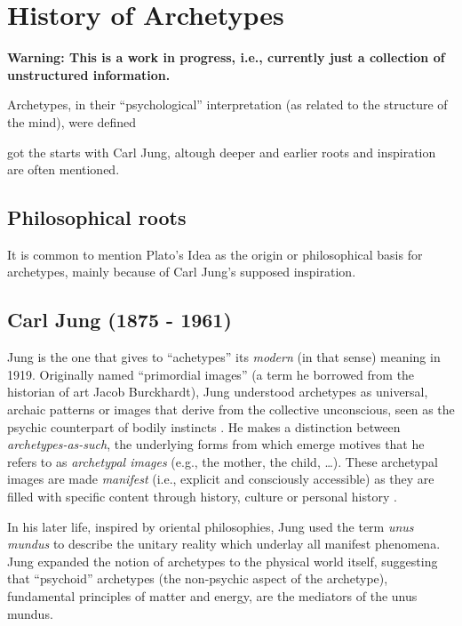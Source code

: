 \documentclass[]{book}
\begin{document}
\hypertarget{history-of-archetypes}{%
\chapter{History of Archetypes}\label{history-of-archetypes}}

\textbf{Warning: This is a work in progress, i.e., currently just a collection of unstructured information.}

Archetypes, in their ``psychological'' interpretation (as related to the structure of the mind), were defined

got the starts with Carl Jung, altough deeper and earlier roots and inspiration are often mentioned.

\hypertarget{philosophical-roots}{%
\section{Philosophical roots}\label{philosophical-roots}}

It is common to mention Plato's Idea as the origin or philosophical basis for archetypes, mainly because of Carl Jung's supposed inspiration.

\hypertarget{carl-jung-1875---1961}{%
\section{Carl Jung (1875 - 1961)}\label{carl-jung-1875---1961}}

Jung is the one that gives to ``achetypes'' its \emph{modern} (in that sense) meaning in 1919. Originally named ``primordial images'' (a term he borrowed from the historian of art Jacob Burckhardt), Jung understood archetypes as universal, archaic patterns or images that derive from the collective unconscious, seen as the psychic counterpart of bodily instincts \citep{feist2009theories}. He makes a distinction between \emph{archetypes-as-such}, the underlying forms from which emerge motives that he refers to as \emph{archetypal images} (e.g., the mother, the child, \ldots). These archetypal images are made \emph{manifest} (i.e., explicit and consciously accessible) as they are filled with specific content through history, culture or personal history \citep{papadopoulos2012}.

In his later life, inspired by oriental philosophies, Jung used the term \emph{unus mundus} to describe the unitary reality which underlay all manifest phenomena. Jung expanded the notion of archetypes to the physical world itself, suggesting that ``psychoid'' archetypes (the non-psychic aspect of the archetype), fundamental principles of matter and energy, are the mediators of the unus mundus.
\end{document}
